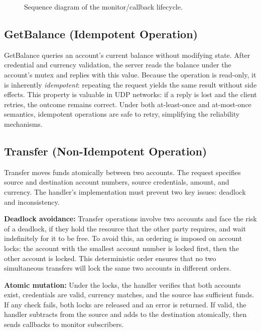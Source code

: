\documentclass[9pt,a4paper]{article}
\begin{document}
\begin{figure}[H]
{
}
\caption{Sequence diagram of the monitor/callback lifecycle.}
\label{fig:monitor-sequence}
\end{figure}
\subsection{GetBalance (Idempotent Operation)}

GetBalance queries an account's current balance without modifying state. After credential and currency validation, the server reads the balance under the account's mutex and replies with this value. Because the operation is read-only, it is inherently \textit{idempotent}: repeating the request yields the same result without side effects. This property is valuable in UDP networks: if a reply is lost and the client retries, the outcome remains correct. Under both at-least-once and at-most-once semantics, idempotent operations are safe to retry, simplifying the reliability mechanisms.

\subsection{Transfer (Non-Idempotent Operation)}

Transfer moves funds atomically between two accounts. The request specifies source and destination account numbers, source credentials, amount, and currency. The handler's implementation must prevent two key issues: deadlock and inconsistency.

\textbf{Deadlock avoidance:} Transfer operations involve two accounts and face the risk of a deadlock, if they hold the resource that the other party requires, and wait indefinitely for it to be free. To avoid this, an ordering is imposed on account locks: the account with the smallest account number is locked first, then the other account is locked. This deterministic order ensures that no two simultaneous transfers will lock the same two accounts in different orders.

\textbf{Atomic mutation:} Under the locks, the handler verifies that both accounts exist, credentials are valid, currency matches, and the source has sufficient funds. If any check fails, both locks are released and an error is returned. If valid, the handler subtracts from the source and adds to the destination atomically, then sends callbacks to monitor subscribers.
\end{document}

